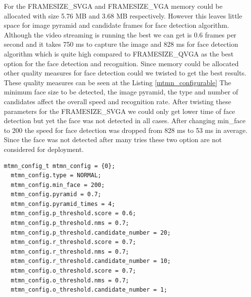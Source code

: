 For the {\selectfont FRAMESIZE\_SVGA} and {\selectfont FRAMESIZE\_VGA}  memory could be allocated with size 5.76 MB and 3.68 MB respectively. However this leaves little space for image pyramid and candidate frames for face detection algorithm. Although the video streaming is running the best we can get is 0.6 frames per second and it takes 750 ms to capture the image  and 828 ms for face detection algorithm which is quite high compared to {\selectfont FRAMESIZE\_QVGA} as the best option for the face detection and recognition. Since memory could be allocated other quality measures for face detection could we twisted to get the best results. These quality measures can be seen at the Listing \ref{mtmn_configurable}
The minimum face size to be detected, the image pyramid, the type and number of candidates affect the overall speed and recognition rate. 
After twisting these parameters for the {\selectfont FRAMESIZE\_SVGA} we could only get lower time of face detection but yet the face was not detected in all cases. After changing {\selectfont min\_face} to 200 the speed for face detection was dropped from 828 ms to 53 ms in average. Since the face was not detected after many tries these two option are not considered for deployment. 



\begin{lstlisting}[caption={Face detection configurable parameters},label=mtmn_configurable, captionpos=b]
 mtmn_config_t mtmn_config = {0};
  mtmn_config.type = NORMAL;
  mtmn_config.min_face = 200;
  mtmn_config.pyramid = 0.7; 
  mtmn_config.pyramid_times = 4;
  mtmn_config.p_threshold.score = 0.6;
  mtmn_config.p_threshold.nms = 0.7;
  mtmn_config.p_threshold.candidate_number = 20; 
  mtmn_config.r_threshold.score = 0.7;
  mtmn_config.r_threshold.nms = 0.7;
  mtmn_config.r_threshold.candidate_number = 10;
  mtmn_config.o_threshold.score = 0.7;
  mtmn_config.o_threshold.nms = 0.7;
  mtmn_config.o_threshold.candidate_number = 1;

\end{lstlisting}





